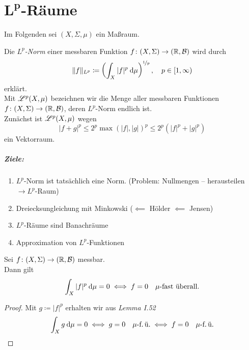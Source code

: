 \documentclass[skript.tex]{subfiles}
\begin{document}
	\chapter{\texorpdfstring{$\boldsymbol{L^p}$}{Lp}-Räume}
	\setcounter{cntr}{0}
		
	\begin{notat*}
		Im Folgenden sei $(X,\Sigma,\mu)$ ein Maßraum.
	\end{notat*}

	\begin{defin}[$L^p$-„Norm“]
		Die \emph{$L^p$-Norm} einer messbaren Funktion $f \colon (X,\Sigma) \to (\mathbb{R},\mathcal{B})$ wird durch
		\[
			\lVert f \rVert_{L^p} \coloneqq \left(
				\int_X |f|^p \: \mathrm{d} \mu
			\right)^{\nicefrac{1}{p}}, \quad p \in [1,\infty)
		\]
		erklärt.
		\medskip\\
		Mit $\mathscr{L}^p(X,\mu)$ bezeichnen wir die Menge aller messbaren Funktionen $f \colon (X,\Sigma) \to (\mathbb{R},\mathcal{B})$, deren $L^p$-Norm endlich ist.\\
		Zunächst ist $\mathscr{L}^p(X,\mu)$ wegen
		\[
			|f+g|^p \leq 2^p \max(|f|,|g|)^p \leq 2^p(|f|^p+|g|^p)
		\]
		ein Vektorraum.
	\end{defin}
	\paragraph{Ziele:}
	\begin{enumerate}[(1)]
		\item $L^p$-Norm ist tatsächlich eine Norm. (Problem: Nullmengen -- herausteilen $\rightarrow L^p$-Raum)
		\item Dreiecksungleichung mit Minkowski ($\impliedby$ Hölder $\impliedby$ Jensen)
		\item $L^p$-Räume sind Banachräume
		\item Approximation von $L^p$-Funktionen
	\end{enumerate}

	\begin{lem}
		Sei $f \colon (X,\Sigma) \to (\mathbb{R},\mathcal{B})$ messbar.\\
		Dann gilt
		\[
			\int_X |f|^p \: \mathrm{d} \mu = 0 \iff f=0 \text{\quad$\mu$-fast überall.}
		\]
	\end{lem}
	\begin{proof}
		Mit $g \coloneqq |f|^p$ erhalten wir aus \emph{Lemma I.52}
		\[
			\int_X g \: \mathrm{d}\mu = 0 \iff g=0 \text{\quad$\mu$-f.\,ü.} \iff f=0 \text{\quad$\mu$-f.\,ü.}
		\]
	\end{proof}
\end{document}
